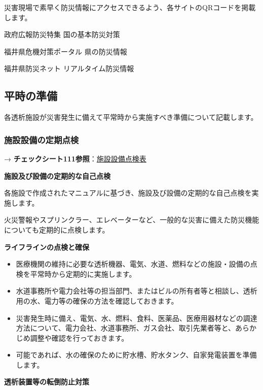 \documentclass[
  japanese,
  letterpaper,
  DIV=11,
  numbers=noendperiod]{scrartcl}
\providecommand{\tightlist}{%
  \setlength{\itemsep}{0pt}\setlength{\parskip}{0pt}}
\begin{document}
災害現場で素早く防災情報にアクセスできるよう、各サイトのQRコードを掲載します。

政府広報防災特集 国の基本防災対策

福井県危機対策ポータル 県の防災情報

福井県防災ネット リアルタイム防災情報

\subsection{平時の準備}\label{ux5e73ux6642ux306eux6e96ux5099}

各透析施設が災害発生に備えて平常時から実施すべき準備について記載します。

\subsubsection{施設設備の定期点検}\label{ux65bdux8a2dux8a2dux5099ux306eux5b9aux671fux70b9ux691c}

→
\textbf{チェックシート111参照}：\href{1311_施設設備点検表.qmd}{施設設備点検表}

\textbf{施設及び設備の定期的な自己点検}

各施設で作成されたマニュアルに基づき、施設及び設備の定期的な自己点検を実施します。

火災警報やスプリンクラー、エレベーターなど、一般的な災害に備えた防災機能についても定期的に点検します。

\textbf{ライフラインの点検と確保}

\begin{itemize}
\tightlist
\item
  医療機関の維持に必要な透析機器、電気、水道、燃料などの施設・設備の点検を平常時から定期的に実施します。
\item
  水道事務所や電力会社等の担当部門、またはビルの所有者等と相談し、透析用の水、電力等の確保の方法を確認しておきます。
\item
  災害発生時に備え、電気、水、燃料、食料、医薬品、医療用器材などの調達方法について、電力会社、水道事務所、ガス会社、取引先業者等と、あらかじめ調整や確認を行っておきます。
\item
  可能であれば、水の確保のために貯水槽、貯水タンク、自家発電装置を準備します。
\end{itemize}

\textbf{透析装置等の転倒防止対策}
\end{document}
